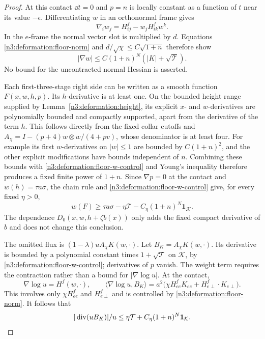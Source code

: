 \begin{proof}
At this contact $\dd t=0$ and $p=n$ is locally constant as a function
of $t$ near its value $-\epsilon$. Differentiating $w$ in an orthonormal
frame gives
\begin{equation}\label{n3:deformation:floor-w-derivative}
 \nabla_iw_j=H^f_{ij}-w_jH^f_{ik}w^k.
\end{equation}
In the $e$-frame the normal vector slot is multiplied by $d$.
Equations \eqref{n3:deformation:floor-norm} and $d/\sqrt\chi\le C\sqrt{1+n}$
therefore show
\begin{equation}\label{n3:deformation:floor-w-control}
 |\nabla w|\le C(1+n)^N(|K|+\sqrt{\mathcal T}).
\end{equation}
No bound for the uncontracted normal Hessian is asserted.

Each first-three-stage right side can be written as a smooth function
$F(x,w,h,p)$. Its $h$-derivative is at least one.
On the bounded height range supplied by Lemma~\ref{n3:deformation:height},
its explicit $x$- and $w$-derivatives are polynomially bounded and
compactly supported, apart from the derivative of the term $h$.
This follows directly from the fixed collar cutoffs and
$A_\chi=I-(p+4)w\otimes w/(4+pv)$, whose denominator is at least four.
For example its first $w$-derivatives on $|w|\le1$ are bounded by
$C(1+n)^2$, and the other explicit modifications have bounds independent
of $n$. Combining these bounds with
\eqref{n3:deformation:floor-w-control} and Young's inequality therefore
produces a fixed finite power of $1+n$.
Since $\nabla p=0$ at the contact and $w(h)=\tau a\sigma$, the chain rule
and \eqref{n3:deformation:floor-w-control} give, for every fixed $\eta>0$,
\begin{equation}\label{n3:deformation:floor-F-control}
 w(F)\ge\tau a\sigma-\eta\mathcal T
                 -C_\eta(1+n)^N\mathbf1_{\mathcal K}.
\end{equation}
The dependence $D_0(x,w,h+\zeta b(x))$ only adds the fixed compact
derivative of $b$ and does not change this conclusion.

The omitted flux is $(1-\lambda)uA_\chi K(w,\cdot)$.
Let $B_K=A_\chi K(w,\cdot)$. Its derivative is bounded by a polynomial
constant times $1+\sqrt{\mathcal T}$ on $\mathcal K$, by
\eqref{n3:deformation:floor-w-control}; derivatives of $p$ vanish.
The weight term requires the contraction rather than a bound for
$|\nabla\log u|$. At the contact,
\[
 \nabla\log u=H^f(w,\cdot),\qquad
 \langle\nabla\log u,B_K\rangle
 =a^2\bigl(\chi H^f_{ee}K_{ee}
                    +H^f_{e\perp}\cdot K_{e\perp}\bigr).
\]
This involves only $\chi H^f_{ee}$ and $H^f_{e\perp}$ and is controlled
by \eqref{n3:deformation:floor-norm}. It follows that
\begin{equation}\label{n3:deformation:floor-flux-control}
 |\operatorname{div}(uB_K)|/u
 \le\eta\mathcal T+C_\eta(1+n)^N\mathbf1_{\mathcal K}.
\end{equation}


\end{proof}
